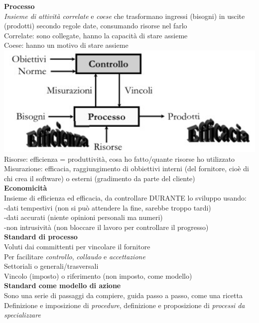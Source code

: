 \documentclass{article}
\begin{document}
		\textbf{Processo}\\
		\textit{Insieme di attività correlate} e \textit{coese} che trasformano ingressi (bisogni) in uscite (prodotti) secondo regole date, consumando risorse nel farlo\\
		Correlate: sono collegate, hanno la capacità di stare assieme\\
		Coese: hanno un motivo di stare assieme\\
		\includegraphics[width=14cm]{processi.jpg}\\
		Risorse: efficienza = produttività, cosa ho fatto/quante risorse ho utilizzato\\
		Misurazione: efficacia, raggiungimento di obbiettivi interni (del fornitore, cioè di chi crea il software) o esterni (gradimento da parte del cliente)\\
		
		\textbf{Economicità}\\
		Insieme di efficienza ed efficacia, da controllare DURANTE lo sviluppo usando:\\
		-dati tempestivi (non si può attendere la fine, sarebbe troppo tardi)\\
		-dati accurati (niente opinioni personali ma numeri)\\
		-non intrusività (non bloccare il lavoro per controllare il progresso)\\

		\textbf{Standard di processo}\\
		Voluti dai committenti per vincolare il fornitore\\
		Per facilitare \textit{controllo}, \textit{collaudo} e \textit{accettazione}\\
		Settoriali o generali/trasversali\\
		Vincolo (imposto) o riferimento (non imposto, come modello)\\
		
		\textbf{Standard come modello di azione}\\
		Sono una serie di passaggi da compiere, guida passo a passo, come una ricetta\\
		Definizione e imposizione di \textit{procedure}, definizione e proposizione di \textit{processi da specializzare}\\
		
\end{document}
